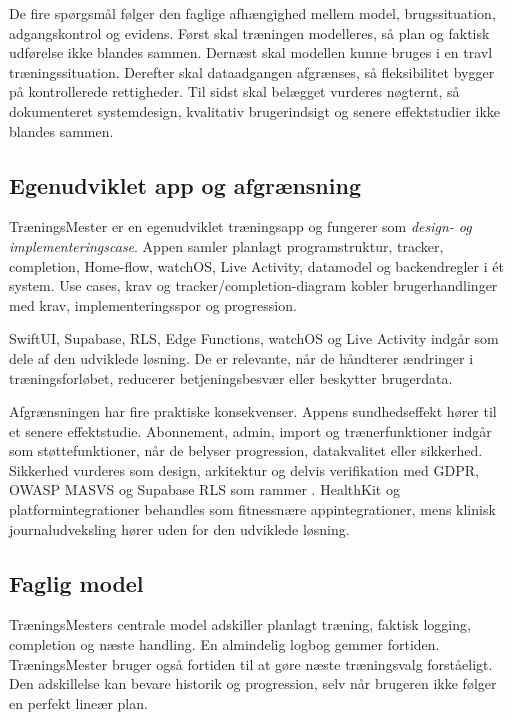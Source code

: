 De fire spørgsmål følger den faglige afhængighed mellem model, brugssituation, adgangskontrol og evidens. Først skal træningen modelleres, så plan og faktisk udførelse ikke blandes sammen. Dernæst skal modellen kunne bruges i en travl træningssituation. Derefter skal dataadgangen afgrænses, så fleksibilitet bygger på kontrollerede rettigheder. Til sidst skal belægget vurderes nøgternt, så dokumenteret systemdesign, kvalitativ brugerindsigt og senere effektstudier ikke blandes sammen.

\subsection{Egenudviklet app og afgrænsning}

TræningsMester er en egenudviklet træningsapp og fungerer som \emph{design- og implementeringscase}. Appen samler planlagt programstruktur, tracker, completion, Home-flow, watchOS, Live Activity, datamodel og backendregler i ét system. Use cases, krav og tracker/completion-diagram kobler brugerhandlinger med krav, implementeringsspor og progression.

SwiftUI, Supabase, RLS, Edge Functions, watchOS og Live Activity indgår som dele af den udviklede løsning. De er relevante, når de håndterer ændringer i træningsforløbet, reducerer betjeningsbesvær eller beskytter brugerdata.

Afgrænsningen har fire praktiske konsekvenser. Appens sundhedseffekt hører til et senere effektstudie. Abonnement, admin, import og trænerfunktioner indgår som støttefunktioner, når de belyser progression, datakvalitet eller sikkerhed. Sikkerhed vurderes som design, arkitektur og delvis verifikation med GDPR, OWASP MASVS og Supabase RLS som rammer \cite{europeanparliament2016_gdpr,owasp2024_masvs,supabase_rls_docs}. HealthKit og platformintegrationer behandles som fitnessnære appintegrationer, mens klinisk journaludveksling hører uden for den udviklede løsning.

\subsection{Faglig model}

TræningsMesters centrale model adskiller planlagt træning, faktisk logging, completion og næste handling. En almindelig logbog gemmer fortiden. TræningsMester bruger også fortiden til at gøre næste træningsvalg forståeligt. Den adskillelse kan bevare historik og progression, selv når brugeren ikke følger en perfekt lineær plan.

